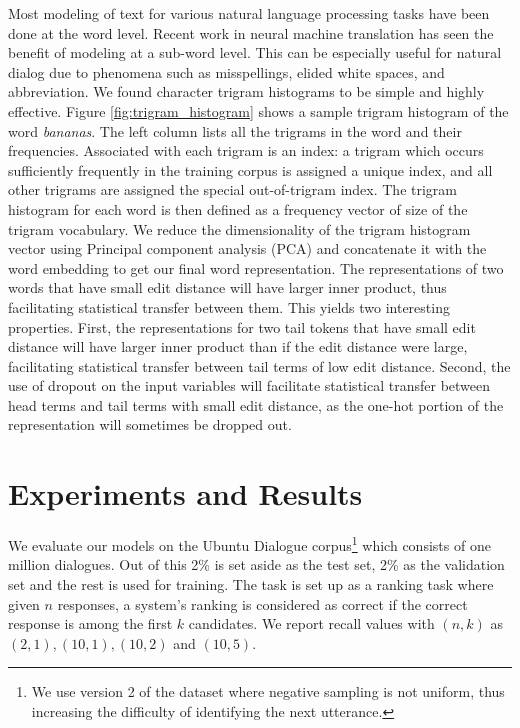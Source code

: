 \documentclass[11pt]{report}
\renewcommand\cite{\citep}	%
\begin{document}
Most modeling of text for various natural language processing tasks have been done at the word level. Recent work in neural machine translation has seen the benefit of modeling at a sub-word level. This can be especially useful for natural dialog due to phenomena such as misspellings, elided white spaces, and abbreviation. We found character trigram histograms to be simple and highly effective. Figure \ref{fig:trigram_histogram} shows a sample trigram histogram of the word \textit{bananas}. The left column lists all the trigrams in the word and their frequencies.  Associated with each trigram is an index: a trigram which occurs sufficiently frequently in the training corpus is assigned a unique index, and all other trigrams are assigned the special out-of-trigram index. The trigram histogram for each word is then defined as a frequency vector of size of the trigram vocabulary.  
We reduce the dimensionality of the trigram histogram vector using Principal component analysis (PCA) \cite{tipping1999probabilistic} and concatenate it with the word embedding to get our final word representation. The representations of two words that have small edit distance will have larger inner product, thus facilitating statistical transfer between them.
This yields two interesting properties.  First, the representations for two tail tokens that have small edit distance will have larger inner product than if the edit distance were large, facilitating statistical transfer between tail terms of low edit distance.  Second, the use of dropout on the input variables will facilitate statistical transfer between head terms and tail terms with small edit distance, as the one-hot portion of the representation will sometimes be dropped out.

\section{Experiments and Results}\label{ubuntu_experiments_results}

We evaluate our models on the Ubuntu Dialogue corpus\footnote{We use version 2 of the dataset where negative sampling is not uniform, thus increasing the difficulty of identifying the next utterance.} which consists of one million dialogues. Out of this 2\% is set aside as the test set, 2\% as the validation set and the rest is used for training. The task is set up as a ranking task where given $n$ responses, a system's ranking is considered as correct if the correct response is among the first $k$ candidates. We report recall values with $(n,k)$ as $(2,1), (10, 1), (10, 2)$ and $(10, 5)$. 
\end{document}

